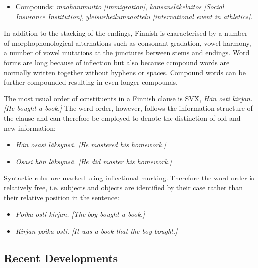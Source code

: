 \documentclass[]{../../metanetpaper}
\begin{document}
\begin{multicols}{2}
\begin{itemize}
\item Compounds:
   \textit{\foreignlanguage{finnish}{\textit{maahanmuutto}} [immigration]},
   \textit{\foreignlanguage{finnish}{\textit{kansaneläkelaitos}}
           [Social Insurance Institution]},
   \textit{\foreignlanguage{finnish}{\textit{yleisurheilumaaottelu}}
           [international event in athletics]}.
\end{itemize}
In addition to the stacking of the endings, Finnish is characterised by a
number of morphophonological alternations such as consonant gradation, vowel
harmony, a number of vowel mutations at the junctures between stems and
endings. Word forms are long because of inflection but also because compound
words are normally written together without hyphens or spaces. Compound words
can be further compounded resulting in even longer compounds.

The most usual order of constituents in a Finnish clause is SVX,
\textit{\foreignlanguage{finnish}{\textit{Hän osti kirjan.}}
        [He bought a book.]}
The word order, however, follows the
information structure of the clause and can therefore be employed to denote the
distinction of old and new information:
\begin{itemize}
\item \textit{\foreignlanguage{finnish}{\textit{Hän osasi läksynsä.}}
              [He mastered his homework.]}

\item \textit{\foreignlanguage{finnish}{\textit{Osasi hän läksynsä.}}
              [He did master his homework.]}
\end{itemize}

Syntactic roles are marked using inflectional marking. Therefore the word order
is relatively free, i.e. subjects and objects are identified by their case
rather than their relative position in the sentence:
\begin{itemize}
\item \textit{\foreignlanguage{finnish}{\textit{Poika osti kirjan.}}
              [The boy bought a book.]}

\item \textit{\foreignlanguage{finnish}{\textit{Kirjan poika osti.}}
              [It was a book that the boy bought.]}
\end{itemize}


\subsection{Recent Developments}


\end{multicols}
\end{document}
